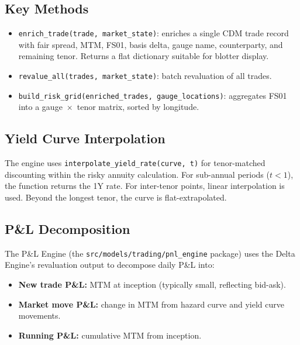 \documentclass[11pt,a4paper]{article}
\begin{document}
\subsection{Key Methods}

\begin{itemize}
    \item \texttt{enrich\_trade(trade, market\_state)}: enriches a single CDM trade record with fair spread, MTM, FS01, basis delta, gauge name, counterparty, and remaining tenor. Returns a flat dictionary suitable for blotter display.
    \item \texttt{revalue\_all(trades, market\_state)}: batch revaluation of all trades.
    \item \texttt{build\_risk\_grid(enriched\_trades, gauge\_locations)}: aggregates FS01 into a gauge~$\times$~tenor matrix, sorted by longitude.
\end{itemize}

\subsection{Yield Curve Interpolation}

The engine uses \texttt{interpolate\_yield\_rate(curve, t)} for tenor-matched discounting within the risky annuity calculation. For sub-annual periods ($t < 1$), the function returns the 1Y rate. For inter-tenor points, linear interpolation is used. Beyond the longest tenor, the curve is flat-extrapolated.

\subsection{P\&L Decomposition}

The P\&L Engine (the \texttt{src/models/trading/pnl\_engine} package) uses the Delta Engine's revaluation output to decompose daily P\&L into:
\begin{itemize}
    \item \textbf{New trade P\&L:} MTM at inception (typically small, reflecting bid-ask).
    \item \textbf{Market move P\&L:} change in MTM from hazard curve and yield curve movements.
    \item \textbf{Running P\&L:} cumulative MTM from inception.
\end{itemize}

\clearpage

\mkmsensitivity
\end{document}
